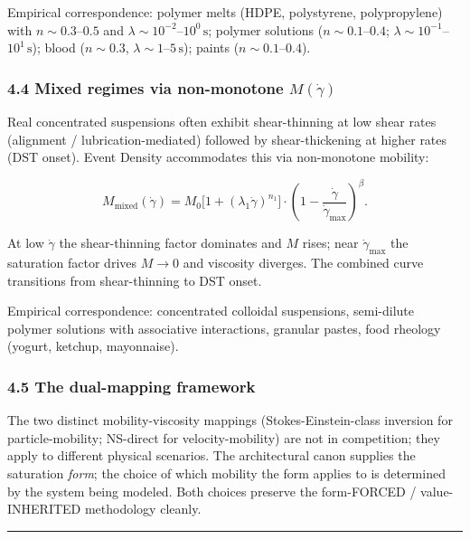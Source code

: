 \documentclass[
  11pt,a4paper]{article}
\begin{document}
Empirical correspondence: polymer melts (HDPE, polystyrene,
polypropylene) with \(n \sim 0.3\)--\(0.5\) and
\(\lambda \sim 10^{-2}\)--\(10^0\,\mathrm{s}\); polymer solutions
(\(n \sim 0.1\)--\(0.4\);
\(\lambda \sim 10^{-1}\)--\(10^1\,\mathrm{s}\)); blood (\(n \sim 0.3\),
\(\lambda \sim 1\)--\(5\,\mathrm{s}\)); paints
(\(n \sim 0.1\)--\(0.4\)).

\subsubsection{\texorpdfstring{4.4 Mixed regimes via non-monotone
\(M(\dot\gamma)\)}{4.4 Mixed regimes via non-monotone M(\textbackslash dot\textbackslash gamma)}}\label{mixed-regimes-via-non-monotone-mdotgamma}

Real concentrated suspensions often exhibit shear-thinning at low shear
rates (alignment / lubrication-mediated) followed by shear-thickening at
higher rates (DST onset). Event Density accommodates this via
non-monotone mobility:

\[M_\mathrm{mixed}(\dot\gamma) = M_0 \bigl[1 + (\lambda_1 \dot\gamma)^{n_1}\bigr] \cdot \left(1 - \frac{\dot\gamma}{\dot\gamma_\mathrm{max}}\right)^\beta.\]

At low \(\dot\gamma\) the shear-thinning factor dominates and \(M\)
rises; near \(\dot\gamma_\mathrm{max}\) the saturation factor drives
\(M \to 0\) and viscosity diverges. The combined curve transitions from
shear-thinning to DST onset.

Empirical correspondence: concentrated colloidal suspensions,
semi-dilute polymer solutions with associative interactions, granular
pastes, food rheology (yogurt, ketchup, mayonnaise).

\subsubsection{4.5 The dual-mapping
framework}\label{the-dual-mapping-framework}

The two distinct mobility-viscosity mappings (Stokes-Einstein-class
inversion for particle-mobility; NS-direct for velocity-mobility) are
not in competition; they apply to different physical scenarios. The
architectural canon supplies the saturation \emph{form}; the choice of
which mobility the form applies to is determined by the system being
modeled. Both choices preserve the form-FORCED / value-INHERITED
methodology cleanly.

\begin{center}\rule{0.5\linewidth}{0.5pt}\end{center}
\end{document}
